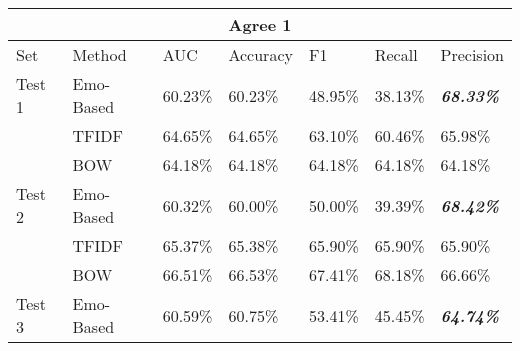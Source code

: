 \documentclass[12pt,a4paper]{report}
\theoremstyle{definition}
\begin{document}
\begin{CJK}{UTF8}{bsmi}
        \begin{table}[H]
            \centering
            \begin{tabular}{l | l | l | l | l | l | l}
                \hline
                \multicolumn{7}{c}{\textbf{Agree 1}} \\
                \hline
                Set & Method & AUC & Accuracy & F1 & Recall & Precision \\
                \hline \hline
                Test 1 & Emo-Based & 60.23\% & 60.23\% & 48.95\% & 38.13\% & \textit{\textbf{68.33\%}}\\
                 & TFIDF & 64.65\% & 64.65\% & 63.10\% & 60.46\% & 65.98\%\\
                 & BOW & 64.18\% & 64.18\% & 64.18\% & 64.18\% & 64.18\%\\
                \hline
                Test 2 & Emo-Based & 60.32\% & 60.00\% & 50.00\% & 39.39\% & \textit{\textbf{68.42\%}}\\
                 & TFIDF & 65.37\% & 65.38\% & 65.90\% & 65.90\% & 65.90\%\\
                 & BOW & 66.51\% & 66.53\% & 67.41\% & 68.18\% & 66.66\%\\
                \hline
                Test 3 & Emo-Based & 60.59\% & 60.75\% & 53.41\% & 45.45\% & \textit{\textbf{64.74\%}}\\

\end{tabular}
\end{table}
\end{CJK}
\end{document}
